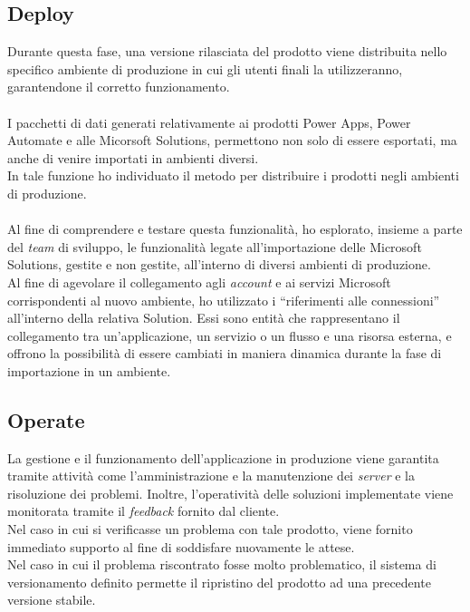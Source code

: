 \subsection{Deploy}
Durante questa fase, una versione rilasciata del prodotto viene distribuita nello specifico ambiente di produzione in cui gli utenti finali la utilizzeranno, garantendone il corretto funzionamento.\\\\
I pacchetti di dati generati relativamente ai prodotti Power Apps, Power Automate e alle Micorsoft Solutions, permettono non solo di essere esportati, ma anche di venire importati in ambienti diversi.\\
In tale funzione ho individuato il metodo per distribuire i prodotti negli ambienti di produzione.\\\\
Al fine di comprendere e testare questa funzionalità, ho esplorato, insieme a parte del \emph{team} di sviluppo, le funzionalità legate all'importazione delle Microsoft Solutions, gestite e non gestite, all'interno di diversi ambienti di produzione.\\ 
Al fine di agevolare il collegamento agli \emph{account} e ai servizi Microsoft corrispondenti al nuovo ambiente, ho utilizzato i “riferimenti alle connessioni” all'interno della relativa Solution.
Essi sono entità che rappresentano il collegamento tra un'applicazione, un servizio o un flusso e una risorsa esterna, e offrono la possibilità di essere cambiati in maniera dinamica durante la fase di importazione in un ambiente.
    

\subsection{Operate}
La gestione e il funzionamento dell'applicazione in produzione viene garantita tramite attività come l'amministrazione e la manutenzione dei \emph{server} e la risoluzione dei problemi. 
Inoltre, l'operatività delle soluzioni implementate viene monitorata tramite il \emph{feedback} fornito dal cliente.\\
Nel caso in cui si verificasse un problema con tale prodotto, viene fornito immediato supporto al fine di soddisfare nuovamente le attese.\\
Nel caso in cui il problema riscontrato fosse molto problematico, il sistema di versionamento definito permette il ripristino del prodotto ad una precedente versione stabile. 

